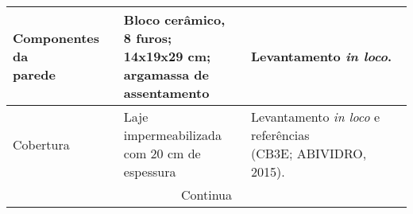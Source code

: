 \begin{table}[ht]
\begin{tabular*}{\columnwidth}{@{\extracolsep{\fill}}lll}
    \makecell[l]{Componentes da\\ parede}                          & \makecell[l]{Bloco cerâmico,\\ 8 furos; \\14x19x29 cm; \\argamassa de\\ assentamento} & Levantamento \textit{in loco}.                                                                                                                                         \\ \hline
    Cobertura                                                      & \makecell[l]{Laje impermeabilizada\\ com 20 cm de\\ espessura}                        & \makecell[l]{Levantamento \textit{in loco} e referências \\(CB3E; ABIVIDRO, 2015).}                                                                                    \\ \hline
    \multicolumn{3}{c}{Continua}\\\hline
    \end{tabular*}
\end{table}\pagebreak
